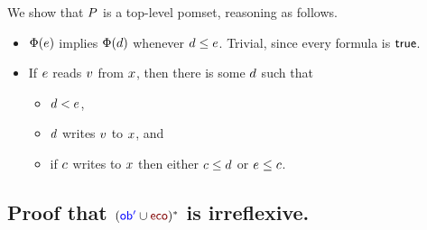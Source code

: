 We show that $P$ is a top-level pomset, reasoning as follows.
\begin{itemize}

\item $\Phi(e)$ implies $\Phi(d)$ whenever
  $d\le e$.   Trivial, since every formula is $\mathsf{true}$.

\item If $e$ reads $v$ from $x$, then there is some $d$ such that
  \begin{itemize}
  \item $d < e$,  
  \item $d$ writes $v$ to $x$, and
  \item if $c$ writes to $x$
    then either $c \leq d$ or $e \leq c$.
  \end{itemize}    
\end{itemize}

\subsection{Proof that  $({\robi} \cup {\reco})^*$ is irreflexive. }


